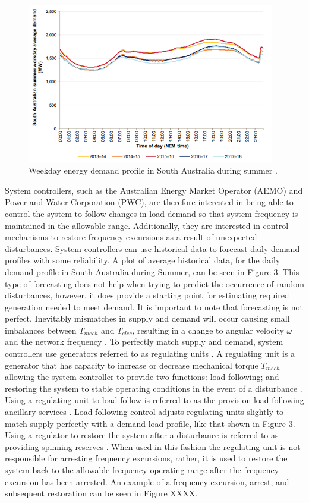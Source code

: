 \documentclass[12pt, a4paper]{article}
\begin{document}
\begin{figure}[h]
	\centering
	\includegraphics[height=7cm]{load_profile}
	\caption{Weekday energy demand profile in South Australia during summer \cite{AEMO2018}.}
\end{figure}

System controllers, such as the Australian Energy Market Operator (AEMO) and Power and Water Corporation (PWC), are therefore interested in being able to control the system to follow changes in load demand so that system frequency is maintained in the allowable range. Additionally, they are interested in control mechanisms to restore frequency excursions as a result of unexpected disturbances. System controllers can use historical data to forecast daily demand profiles with some reliability. A plot of average historical data, for the daily demand profile in South Australia during Summer, can be seen in Figure 3. This type of forecasting does not help when trying to predict the occurrence of random disturbances, however, it does provide a starting point for estimating required generation needed to meet demand. It is important to note that forecasting is not perfect. Inevitably mismatches in supply and demand will occur causing small imbalances between $T_{mech}$ and $T_{elec}$, resulting in a change to angular velocity $\omega$ and the network frequency \cite{Glover2012}. To perfectly match supply and demand, system controllers use generators referred to as regulating units \cite{Kothari2011}. A regulating unit is a generator that has capacity to increase or decrease mechanical torque $T_{mech}$ allowing the system controller to provide two functions: load following; and restoring the system to stable operating conditions in the event of a disturbance \cite{Grainger1994}. Using a regulating unit to load follow is referred to as the provision load following ancillary services \cite{AEMO202002}. Load following control adjusts regulating units slightly to match supply perfectly with a demand load profile, like that shown in Figure 3. Using a regulator to restore the system after a disturbance is referred to as providing spinning reserves \cite{AEMO202002}. When used in this fashion the regulating unit is not responsible for arresting frequency excursions, rather, it is used to restore the system back to the allowable frequency operating range after the frequency excursion has been arrested. An example of a frequency excursion, arrest, and subsequent restoration can be seen in Figure XXXX.
\end{document}
